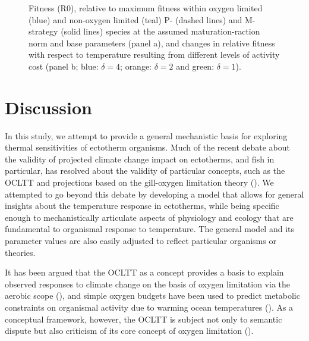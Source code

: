\documentclass[a4paper, toc=index,abstract=true]{scrartcl}\usepackage[]{graphicx}\usepackage[]{color}
\begin{document}
\begin{spacing}{1.9}
\begin{figure}
\caption[Fitness (R0), relative to maximum fitness within oxygen limited (blue) and non-oxygen limited (teal) P- (dashed lines) and M-strategy (solid lines) species at the assumed maturation-raction norm and base parameters (panel a), and changes in relative fitness with respect to temperature resulting from different levels of activity cost (panel b]{Fitness (R0), relative to maximum fitness within oxygen limited (blue) and non-oxygen limited (teal) P- (dashed lines) and M-strategy (solid lines) species at the assumed maturation-raction norm and base parameters (panel a), and changes in relative fitness with respect to temperature resulting from different levels of activity cost (panel b; blue: $\delta=4$; orange: $\delta=2$ and green: $\delta=1$).}\label{fig:fit}
\end{figure}




\section{Discussion}

In this study, we attempt to provide a general mechanistic basis for exploring thermal sensitivities of ectotherm organisms. Much of the recent debate about the validity of projected climate change impact on ectotherms, and fish in particular, has resolved about the validity of particular concepts, such as the OCLTT and projections based on the gill-oxygen limitation theory (\cite{pauly_sound_2017,lefevre_modelling_2017}). We attempted to go beyond this debate by developing a model that allows for general insights about the temperature response in ectotherms, while being specific enough to mechanistically articulate aspects of physiology and ecology that are fundamental to organismal response to temperature. The general model and its parameter values are also easily adjusted to reflect particular organisms or theories. 

It has been argued that the OCLTT as a concept provides a basis to explain observed responses to climate change on the basis of oxygen limitation via the aerobic scope (\cite{portner_physiology_2008,portner_oxygen-and_2010}), and simple oxygen budgets have been used to predict metabolic constraints on organismal activity due to warming ocean temperatures (\cite{deutsch_climate_2015}). As a conceptual framework, however, the OCLTT is subject not only to semantic dispute but also criticism of its core concept of oxygen limitation (\cite{jutfelt_oxygen-and_2018,lefevre_are_2016}).


\end{spacing}
\end{document}
